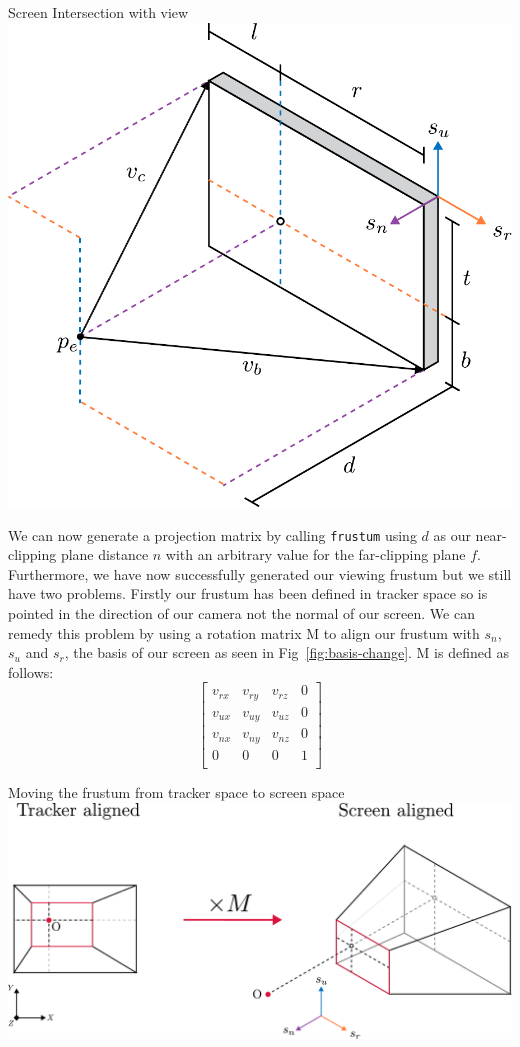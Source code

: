 \begin{figureBox}[label={fig:screen-extents}, width=0.8\linewidth]{Screen Intersection with view}
    \includegraphics[width = 0.5\linewidth]{./background/figures/projection/eye-projection.pdf}
\end{figureBox}

We can now generate a projection matrix by calling \texttt{frustum} using $d$ as our near-clipping plane distance $n$ with an arbitrary value for the far-clipping plane $f$. Furthermore, we have now successfully generated our viewing frustum but we still have two problems. Firstly our frustum has been defined in tracker space so is pointed in the direction of our camera not the normal of our screen. We can remedy this problem by using a rotation matrix M to align our frustum with $s_n$, $s_u$ and $s_r$, the basis of our screen as seen in Fig~\ref{fig:basis-change}. M is defined as follows:
\[
    \begin{bmatrix}
        v_{rx} & v_{ry} & v_{rz} & 0 \\
        v_{ux} & v_{uy} & v_{uz} & 0 \\
        v_{nx} & v_{ny} & v_{nz} & 0 \\
        0      & 0      & 0      & 1 \\
    \end{bmatrix}
\]

\begin{figureBox}[label={fig:basis-change}, width=0.8\linewidth]{Moving the frustum from tracker space to screen space}
    \includegraphics[width = 0.8\linewidth]{./background/figures/projection/realignment.pdf}
\end{figureBox}

